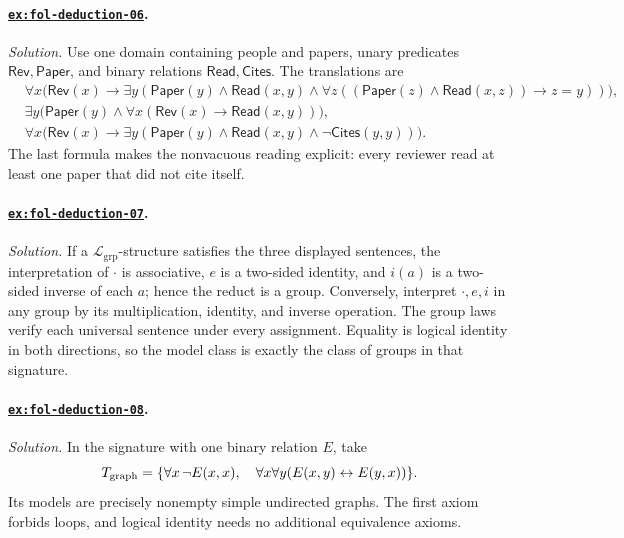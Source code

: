 \documentclass[11pt,oneside,openany]{book}
\theoremstyle{definition}
\theoremstyle{plain}
\theoremstyle{remark}
\DeclarePairedDelimiter{\set}{\lbrace}{\rbrace}
\newcommand{\Lang}{\mathcal{L}}
\begin{document}
\paragraph{\hyperref[ex:fol-deduction-06]{\texttt{ex:fol-deduction-06}}.}
\textit{Solution.}  Use one domain containing people and papers, unary
predicates \(\mathsf{Rev},\mathsf{Paper}\), and binary relations
\(\mathsf{Read},\mathsf{Cites}\).  The translations are
\[
\begin{aligned}
&\forall x\bigl(\mathsf{Rev}(x)\to\exists y(\mathsf{Paper}(y)\land
 \mathsf{Read}(x,y)\land
 \forall z((\mathsf{Paper}(z)\land\mathsf{Read}(x,z))\to z=y))\bigr),\\
&\exists y\bigl(\mathsf{Paper}(y)\land
 \forall x(\mathsf{Rev}(x)\to\mathsf{Read}(x,y))\bigr),\\
&\forall x\bigl(\mathsf{Rev}(x)\to\exists y(\mathsf{Paper}(y)\land
 \mathsf{Read}(x,y)\land\neg\mathsf{Cites}(y,y))\bigr).
\end{aligned}
\]
The last formula makes the nonvacuous reading explicit: every reviewer read at
least one paper that did not cite itself.

\paragraph{\hyperref[ex:fol-deduction-07]{\texttt{ex:fol-deduction-07}}.}
\textit{Solution.}  If a \(\Lang_{\mathrm{grp}}\)-structure satisfies the three
displayed sentences, the interpretation of \(\cdot\) is associative,
\(e\) is a two-sided identity, and \(i(a)\) is a two-sided inverse of each
\(a\); hence the reduct is a group.  Conversely, interpret \(\cdot,e,i\) in
any group by its multiplication, identity, and inverse operation.  The group
laws verify each universal sentence under every assignment.  Equality is
logical identity in both directions, so the model class is exactly the class of
groups in that signature.

\paragraph{\hyperref[ex:fol-deduction-08]{\texttt{ex:fol-deduction-08}}.}
\textit{Solution.}  In the signature with one binary relation \(E\), take
\[
T_{\mathrm{graph}}=\set{
\forall x\,\neg E(x,x),\quad
\forall x\forall y(E(x,y)\leftrightarrow E(y,x))}.
\]
Its models are precisely nonempty simple undirected graphs.  The first axiom
forbids loops, and logical identity needs no additional equivalence axioms.
\end{document}

